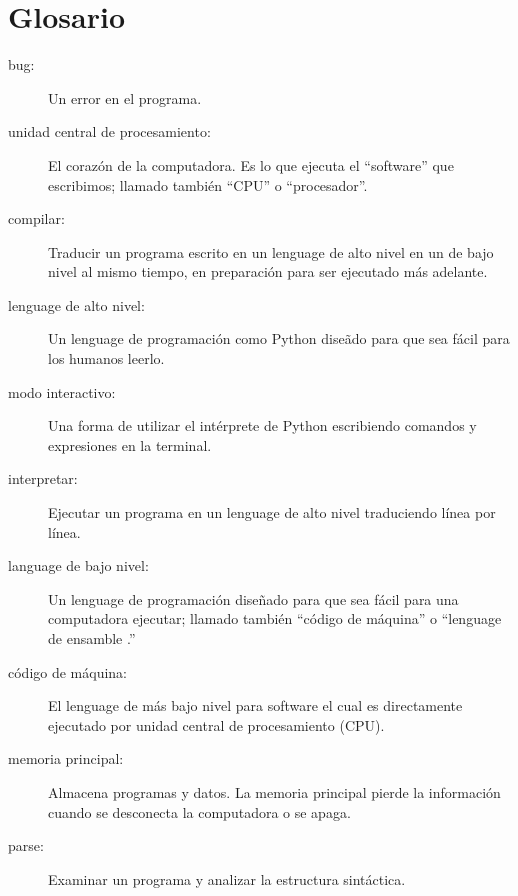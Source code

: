 \section{Glosario}

\begin{description}

\item[bug:]  Un error en el programa.

\item[unidad central de procesamiento:] El coraz\'on de la computadora. Es lo que ejecuta el ``software'' que escribimos; llamado tambi\'en ``CPU'' o ``procesador''.

\item[compilar:]  Traducir un programa escrito en un lenguage de alto nivel en un de bajo nivel al mismo tiempo, en preparaci\'on para ser ejecutado m\'as adelante.

\item[lenguage de alto nivel:]  Un lenguage de programaci\'on como Python dise\~ado para que sea f\'acil para los humanos leerlo.

\item[modo interactivo:] Una forma de utilizar el int\'erprete de Python escribiendo comandos y expresiones en la terminal.

\item[interpretar:]  Ejecutar un programa en un lenguage de alto nivel traduciendo l\'inea por l\'inea.

\item[language de bajo nivel:]  Un lenguage de programaci\'on dise\~nado para que sea f\'acil para una computadora ejecutar; llamado tambi\'en ``c\'odigo de m\'aquina'' o
``lenguage de ensamble .''

\item[c\'odigo de m\'aquina:]  El lenguage de m\'as bajo nivel para software el cual es directamente ejecutado por unidad central de procesamiento
(CPU).

\item[memoria principal:] Almacena programas y datos. La memoria principal pierde la informaci\'on cuando se desconecta la computadora o se apaga.

\item[parse:]  Examinar un programa y analizar la estructura sint\'actica.


\end{description}
